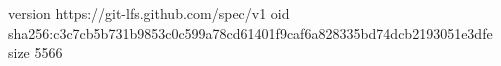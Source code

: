 version https://git-lfs.github.com/spec/v1
oid sha256:c3c7cb5b731b9853c0c599a78cd61401f9caf6a828335bd74dcb2193051e3dfe
size 5566
